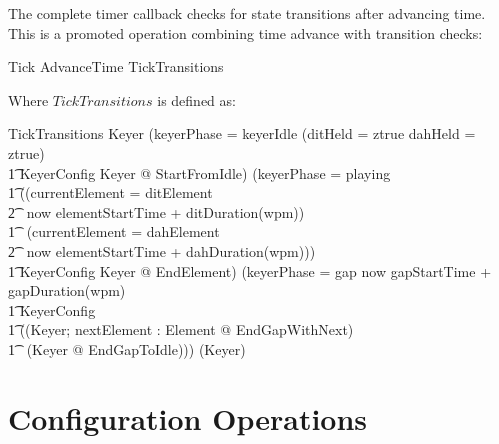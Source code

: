 \documentclass[a4paper,10pt,fleqn]{article}
\begin{document}
The complete timer callback checks for state transitions after advancing time.
This is a promoted operation combining time advance with transition checks:

\begin{zed}
Tick  AdvanceTime \semi TickTransitions
\end{zed}

Where $TickTransitions$ is defined as:

\begin{schema}{TickTransitions}
\Delta Keyer
\where
(keyerPhase = keyerIdle \land (ditHeld = ztrue \lor dahHeld = ztrue) \\
\t1 \land \Xi KeyerConfig \land \exists \Delta Keyer @ StartFromIdle) \lor
(keyerPhase = playing \land \\
\t1 ((currentElement = ditElement \land \\
\t2 ~now \geq elementStartTime + ditDuration(wpm)) \lor \\
\t1 ~(currentElement = dahElement \land \\
\t2 ~now \geq elementStartTime + dahDuration(wpm))) \\
\t1 \land \Xi KeyerConfig \land \exists \Delta Keyer @ EndElement) \lor
(keyerPhase = gap \land now \geq gapStartTime + gapDuration(wpm) \land \\
\t1 \Xi KeyerConfig \land \\
\t1 ((\exists \Delta Keyer; nextElement : Element @ EndGapWithNext) \lor \\
\t1 ~(\exists \Delta Keyer @ EndGapToIdle))) \lor
(\Xi Keyer)
\end{schema}

\section{Configuration Operations}
\end{document}
